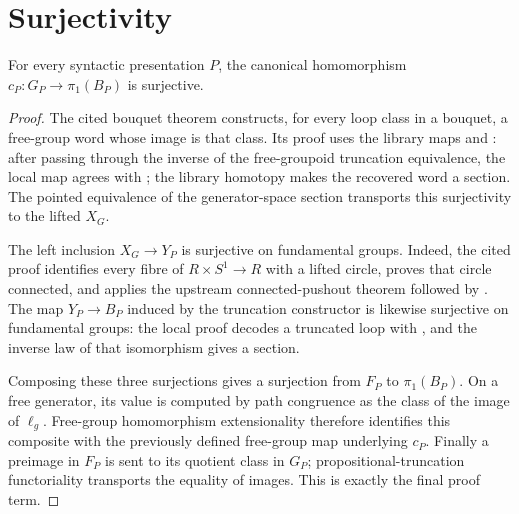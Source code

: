 \section{Surjectivity}

\begin{theorem}
For every syntactic presentation $P$, the canonical homomorphism $c_P:G_P\to\pi_1(B_P)$ is surjective.
\end{theorem}
\begin{proof}
The cited bouquet theorem constructs, for every loop class in a bouquet, a free-group word whose image is that class. Its proof uses the library maps  and : after passing through the inverse of the free-groupoid truncation equivalence, the local map  agrees with ; the library homotopy  makes the recovered word a section. The pointed equivalence of the generator-space section transports this surjectivity to the lifted $X_G$.

The left inclusion $X_G\to Y_P$ is surjective on fundamental groups. Indeed, the cited proof identifies every fibre of $R\times S^1\to R$ with a lifted circle, proves that circle connected, and applies the upstream connected-pushout theorem followed by . The map $Y_P\to B_P$ induced by the truncation constructor is likewise surjective on fundamental groups: the local proof decodes a truncated loop with , and the inverse law of that isomorphism gives a section.

Composing these three surjections gives a surjection from $F_P$ to $\pi_1(B_P)$. On a free generator, its value is computed by path congruence as the class of the image of $\ell_g$. Free-group homomorphism extensionality therefore identifies this composite with the previously defined free-group map underlying $c_P$. Finally a preimage in $F_P$ is sent to its quotient class in $G_P$; propositional-truncation functoriality transports the equality of images. This is exactly the final proof term.
\end{proof}
